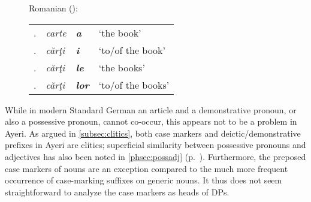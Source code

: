 \begin{figure}
\begin{minipage}[t]{.6\remaining}
\a\label{ex:romdecl}%
Romanian (\cite[75]{lyons1999}):\medskip\\ %
\begin{tabular}[t]{@{} l >{\itshape}l @{} >{\itshape\bfseries}l l}
\Pri{}.\Sg{}
	& carte & a
	& `the book'
	\\

\Obl{}.\Sg{}
	& cărţi & i
	& `to/of the book'
	\\

\Pri{}.\Pl{}
	& cărţi & le
	& `the books'
	\\

\Obl{}.\Pl{}
	& cărţi & lor
	& `to/of the books'
	\\
\end{tabular}
\xe
\end{minipage}
\end{figure}

While in modern Standard German an article and a demonstrative pronoun, or also
a possessive pronoun, cannot co-occur, this appears not to be a problem in
Ayeri. As argued in \autoref{subsec:clitics}, both case markers and
deictic/demonstrative prefixes in Ayeri are clitics; superficial similarity
between possessive pronouns and adjectives has also been noted in
\autoref{phsec:possadj} (p.~\pageref{phsec:possadj}). Furthermore, the preposed
case markers of nouns are an exception compared to the much more frequent
occurrence of case-marking suffixes on generic nouns. It thus does not seem
straightforward to analyze the case markers as heads of DPs.

